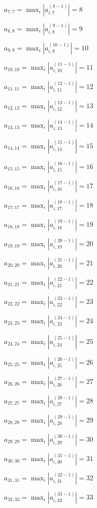 \documentclass[a4paper,12pt]{article}
\begin{document}
$a _{ 7, 7 } =  \max _i |a _{ i, 7 } ^{ (8 - 1) } | = 8$

$a _{ 8, 8 } =  \max _i |a _{ i, 8 } ^{ (9 - 1) } | = 9$

$a _{ 9, 9 } =  \max _i |a _{ i, 9 } ^{ (10 - 1) } | = 10$

$a _{ 10, 10 } =  \max _i |a _{ i, 10 } ^{ (11 - 1) } | = 11$

$a _{ 11, 11 } =  \max _i |a _{ i, 11 } ^{ (12 - 1) } | = 12$

$a _{ 12, 12 } =  \max _i |a _{ i, 12 } ^{ (13 - 1) } | = 13$

$a _{ 13, 13 } =  \max _i |a _{ i, 13 } ^{ (14 - 1) } | = 14$

$a _{ 14, 14 } =  \max _i |a _{ i, 14 } ^{ (15 - 1) } | = 15$

$a _{ 15, 15 } =  \max _i |a _{ i, 15 } ^{ (16 - 1) } | = 16$

$a _{ 16, 16 } =  \max _i |a _{ i, 16 } ^{ (17 - 1) } | = 17$

$a _{ 17, 17 } =  \max _i |a _{ i, 17 } ^{ (18 - 1) } | = 18$

$a _{ 18, 18 } =  \max _i |a _{ i, 18 } ^{ (19 - 1) } | = 19$

$a _{ 19, 19 } =  \max _i |a _{ i, 19 } ^{ (20 - 1) } | = 20$

$a _{ 20, 20 } =  \max _i |a _{ i, 20 } ^{ (21 - 1) } | = 21$

$a _{ 21, 21 } =  \max _i |a _{ i, 21 } ^{ (22 - 1) } | = 22$

$a _{ 22, 22 } =  \max _i |a _{ i, 22 } ^{ (23 - 1) } | = 23$

$a _{ 23, 23 } =  \max _i |a _{ i, 23 } ^{ (24 - 1) } | = 24$

$a _{ 24, 24 } =  \max _i |a _{ i, 24 } ^{ (25 - 1) } | = 25$

$a _{ 25, 25 } =  \max _i |a _{ i, 25 } ^{ (26 - 1) } | = 26$

$a _{ 26, 26 } =  \max _i |a _{ i, 26 } ^{ (27 - 1) } | = 27$

$a _{ 27, 27 } =  \max _i |a _{ i, 27 } ^{ (28 - 1) } | = 28$

$a _{ 28, 28 } =  \max _i |a _{ i, 28 } ^{ (29 - 1) } | = 29$

$a _{ 29, 29 } =  \max _i |a _{ i, 29 } ^{ (30 - 1) } | = 30$

$a _{ 30, 30 } =  \max _i |a _{ i, 30 } ^{ (31 - 1) } | = 31$

$a _{ 31, 31 } =  \max _i |a _{ i, 31 } ^{ (32 - 1) } | = 32$

$a _{ 32, 32 } =  \max _i |a _{ i, 32 } ^{ (33 - 1) } | = 33$
\end{document}
